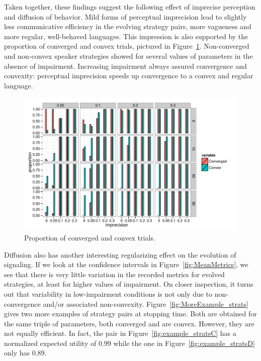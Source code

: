 Taken together, these findings suggest the following effect of
imprecise perception and diffusion of behavior. Mild forms of
perceptual imprecision lead to slightly less communicative efficiency
in the evolving strategy pairs, more vagueness and more regular,
well-behaved languages. This impression is also supported by the
proportion of converged and convex trials, pictured in
Figure~\ref{fig:CategoricalMeasures}. Non-converged and non-convex
speaker strategies showed for several values of parameters in the
absence of impairment. Increasing impairment always assured
convergence and convexity: perceptual imprecision speeds up
convergence to a convex and regular language.

\begin{figure}
  \centering
  
  \includegraphics[width=\textwidth]{plots/CategoricalMeasures.pdf}

  \caption{Proportion of converged and convex trials.}
  \label{fig:CategoricalMeasures}
\end{figure}

Diffusion also has another interesting regularizing effect on the
evolution of signaling. If we look at the confidence intervals in
Figure~\ref{fig:MeanMetrics}, we see that there is very little
variation in the recorded metrics for evolved strategies, at least for
higher values of impairment. On closer inspection, it turns out that
variability in low-impairment conditions is not only due to
non-convergence and/or associated
non-convexity. Figure~\ref{fig:MoreExample_strats} gives two more
examples of strategy pairs at stopping time. Both are obtained for the
same triple of parameters, both converged and are convex. However,
they are not equally efficient. In fact, the pair in
Figure~\ref{fig:example_stratsC} has a normalized expected utility of
$0.99$ while the one in Figure~\ref{fig:example_stratsD} only has
$0.89$.



